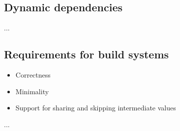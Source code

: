 \subsection{Dynamic dependencies}

...


\subsection{Requirements for build systems}

\begin{itemize}
    \item Correctness
    \item Minimality
    \item Support for sharing and skipping intermediate values
\end{itemize}
...
